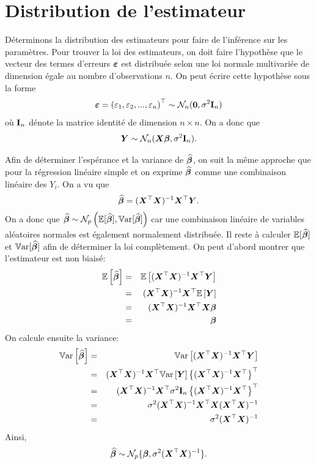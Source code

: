 
\section{Distribution de l'estimateur}

Déterminons la distribution des estimateurs pour faire de l'inférence sur les paramètres.  Pour trouver la loi des estimateurs, on doit faire l'hypothèse que le vecteur des termes d'erreurs $\bm\varepsilon$ est distribuée selon une loi normale multivariée de dimension égale au nombre d'observations $n$. 
On peut écrire cette hypothèse sous la forme
$$\bm\varepsilon=\left(\varepsilon_1,\varepsilon_2,...,\varepsilon_n\right)^\top \sim \mathcal{N}_n(\textbf{0}, \sigma^2\bold{I}_n)$$
où  $\bold{I}_n$ dénote la matrice identité de dimension $n\times n$.
On a donc que
\begin{eqnarray*}
	\bm{Y} \sim \mathcal{N}_n (\bm{X}\bm\beta, \sigma^2 \bold{I}_n).
\end{eqnarray*}

Afin de déterminer l'espérance et la variance de $\widehat{\bm\beta}$, on suit la même approche que pour la régression linéaire simple et on exprime $\widehat{\bm\beta}$ comme une combinaison linéaire des $Y_i$.
On a vu que
\begin{eqnarray*}
	\widehat{\bm\beta}=(\bm{X}^\top\bm{X})^{-1}\bm{X}^\top\bm{Y}.
\end{eqnarray*}
On a donc que $\widehat{\bm\beta} \sim \mathcal{N}_p\left(\mathbb{E}[\widehat{\bm\beta}],\mathbb{V}\text{ar}[\widehat{\bm\beta}]\right)$ car une combinaison linéaire de variables aléatoires normales est également normalement distribuée. Il reste à calculer $\mathbb{E}[\widehat{\bm\beta}]$ et $\mathbb{V}\text{ar}[\widehat{\bm\beta}]$ afin de déterminer la loi complètement.
On peut d'abord montrer que l'estimateur est non biaisé:
\begin{eqnarray*}
	\mathbb{E}\left[\widehat{\bm\beta}\right]&=&\mathbb{E}\left[(\bm{X}^\top\bm{X})^{-1}\bm{X}^\top\bm{Y}\right] \\
	&=& (\bm{X}^\top\bm{X})^{-1}\bm{X}^\top \mathbb{E}\left[\bm{Y}\right]\\
	&=& (\bm{X}^\top\bm{X})^{-1}\bm{X}^\top \bm{X}\bm\beta\\
	&=& \bm\beta
\end{eqnarray*}
On calcule ensuite la variance:
\begin{eqnarray*}
	\mathbb{V}\text{ar}\left[\widehat{\bm\beta}\right]&=& \mathbb{V}\text{ar}\left[(\bm{X}^\top\bm{X})^{-1}\bm{X}^\top\bm{Y}\right]\\
	&=& (\bm{X}^\top\bm{X})^{-1}\bm{X}^\top \mathbb{V}\text{ar}\left[\bm{Y}\right] \left\{(\bm{X}^\top\bm{X})^{-1}\bm{X}^\top\right\}^\top\\
	&=& (\bm{X}^\top\bm{X})^{-1}\bm{X}^\top \sigma^2\bold{I}_n \left\{(\bm{X}^\top\bm{X})^{-1}\bm{X}^\top\right\}^\top\\
	&=& \sigma^2 (\bm{X}^\top\bm{X})^{-1} \bm{X}^\top \bm{X}(\bm{X}^\top\bm{X})^{-1}\\
	&=& \sigma^2 (\bm{X}^\top\bm{X})^{-1}
\end{eqnarray*}
Ainsi,
\begin{eqnarray}
	\widehat{\bm\beta} \sim \mathcal{N}_p\{\bm\beta,\sigma^2 (\bm{X}^\top\bm{X})^{-1}\}.
	\label{loibeta}
\end{eqnarray}


